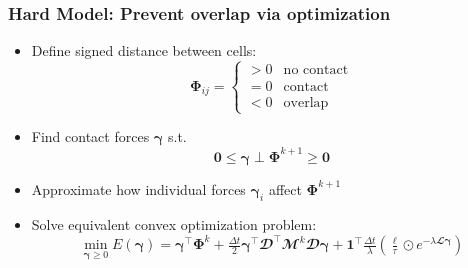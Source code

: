 \documentclass[10pt,t]{beamer}
\begin{document}
\begin{frame}
    \frametitle{Hard Model: Prevent overlap via optimization}

    \begin{itemize}
        \item Define signed distance between cells:
              \[
                  \boldsymbol{\Phi}_{ij} =
                  \begin{cases}
                      > 0 & \text{no contact} \\
                      = 0 & \text{contact}    \\
                      < 0 & \text{overlap}
                  \end{cases}
              \]

        \item Find contact forces $\boldsymbol{\gamma}$ s.t.
              \[
                  \boldsymbol{0} \le \boldsymbol{\gamma} \perp \boldsymbol{\Phi}^{k+1} \ge \boldsymbol{0}
              \]

        \item Approximate how individual forces $\boldsymbol{\gamma}_{i}$ affect $\boldsymbol{\Phi}^{k+1}$
        \item Solve equivalent convex optimization problem:
              \[
                  \min_{\boldsymbol{\gamma} \ge 0} E(\boldsymbol{\gamma})
                  = \boldsymbol{\gamma}^\top \boldsymbol{\Phi}^k
                  + \tfrac{\Delta t}{2}\boldsymbol{\gamma}^\top
                  \mathbfcal{D}^\top \mathbfcal{M}^k \mathbfcal{D}\boldsymbol{\gamma}
                  + \mathbf{1}^\top \tfrac{\Delta t}{\lambda}
                  \left( \tfrac{\boldsymbol{\ell}}{\tau} \odot
                  e^{-\lambda \mathbfcal{L} \boldsymbol{\gamma}} \right)
              \]

    \end{itemize}

\end{frame}
\end{document}
